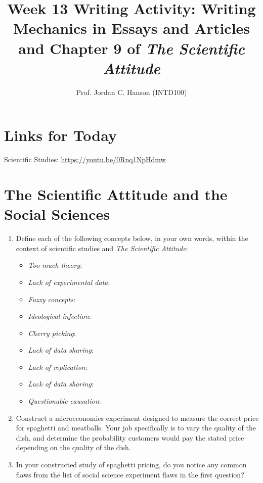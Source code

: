 \documentclass{article}
\begin{document}
\title{Week 13 Writing Activity: Writing Mechanics in Essays and Articles and Chapter 9 of \textit{The Scientific Attitude}}
\author{Prof. Jordan C. Hanson (INTD100)}

\maketitle

\section{Links for Today}

Scientific Studies: \url{https://youtu.be/0Rnq1NpHdmw}

\section{The Scientific Attitude and the Social Sciences}

\begin{enumerate}
\item Define each of the following concepts below, in your own words, within the context of scientific studies and \textit{The Scientific Attitude}:
\begin{itemize}
\item \textit{Too much theory}:
\item \textit{Lack of experimental data}:
\item \textit{Fuzzy concepts}:
\item \textit{Ideological infection}:
\item \textit{Cherry picking}:
\item \textit{Lack of data sharing}:
\item \textit{Lack of replication}:
\item \textit{Lack of data sharing}:
\item \textit{Questionable causation}:
\end{itemize} \vspace{2cm}
\item Construct a microeconomics experiment designed to measure the correct price for spaghetti and meatballs.  Your job specifically is to vary the quality of the dish, and determine the probability customers would pay the stated price depending on the quality of the dish. \\ \vspace{2cm}
\item In your constructed study of spaghetti pricing, do you notice any common flaws from the list of social science experiment flaws in the first question?
\end{enumerate}
\end{document}

